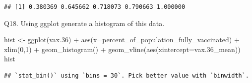 \documentclass[
]{article}
\newenvironment{Shaded}{\begin{snugshade}}{\end{snugshade}}
\newcommand{\AttributeTok}[1]{\textcolor[rgb]{0.77,0.63,0.00}{#1}}
\newcommand{\CommentTok}[1]{\textcolor[rgb]{0.56,0.35,0.01}{\textit{#1}}}
\newcommand{\DecValTok}[1]{\textcolor[rgb]{0.00,0.00,0.81}{#1}}
\newcommand{\FloatTok}[1]{\textcolor[rgb]{0.00,0.00,0.81}{#1}}
\newcommand{\FunctionTok}[1]{\textcolor[rgb]{0.00,0.00,0.00}{#1}}
\newcommand{\NormalTok}[1]{#1}
\newcommand{\OtherTok}[1]{\textcolor[rgb]{0.56,0.35,0.01}{#1}}
\newcommand{\SpecialCharTok}[1]{\textcolor[rgb]{0.00,0.00,0.00}{#1}}
\begin{document}
\begin{Shaded}
\end{Shaded}

\begin{verbatim}
## [1] 0.380369 0.645662 0.718073 0.790663 1.000000
\end{verbatim}

\begin{Shaded}
\end{Shaded}

Q18. Using ggplot generate a histogram of this data.

\begin{Shaded}
\begin{Highlighting}[]
\NormalTok{hist }\OtherTok{\textless{}{-}} \FunctionTok{ggplot}\NormalTok{(vax}\FloatTok{.36}\NormalTok{) }\SpecialCharTok{+}
  \FunctionTok{aes}\NormalTok{(}\AttributeTok{x=}\NormalTok{percent\_of\_population\_fully\_vaccinated) }\SpecialCharTok{+}
  \FunctionTok{xlim}\NormalTok{(}\DecValTok{0}\NormalTok{,}\DecValTok{1}\NormalTok{) }\SpecialCharTok{+}
  \FunctionTok{geom\_histogram}\NormalTok{() }\SpecialCharTok{+} \FunctionTok{geom\_vline}\NormalTok{(}\FunctionTok{aes}\NormalTok{(}\AttributeTok{xintercept=}\NormalTok{vax}\FloatTok{.36}\NormalTok{\_mean))}
\NormalTok{hist}
\end{Highlighting}
\end{Shaded}

\begin{verbatim}
## `stat_bin()` using `bins = 30`. Pick better value with `binwidth`.
\end{verbatim}
\end{document}

